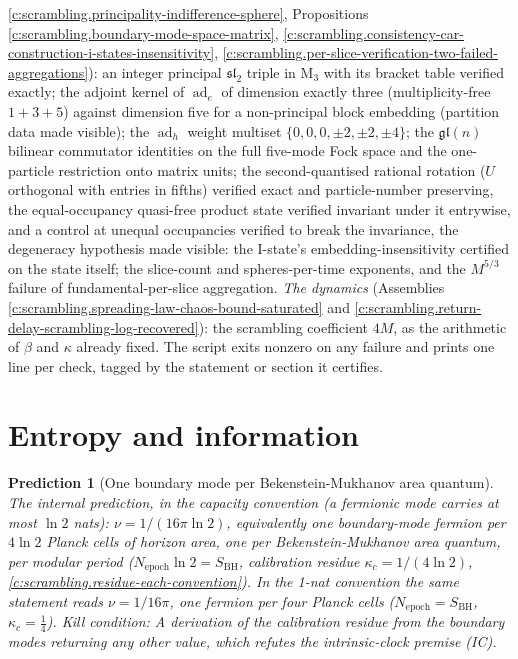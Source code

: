 \documentclass[11pt]{article}
\newtheorem{prediction}[theorem]{Prediction}
\theoremstyle{definition}
\theoremstyle{plain}
\providecommand{\Mat}{}\renewcommand{\Mat}{\mathrm{M}}
\begin{document}
\ref{c:scrambling.principality-indifference-sphere}, Propositions \ref{c:scrambling.boundary-mode-space-matrix}, \ref{c:scrambling.consistency-car-construction-i-states-insensitivity}, \ref{c:scrambling.per-slice-verification-two-failed-aggregations}): an integer principal $\mathfrak{sl}_2$ triple in $\Mat_3$ with its bracket table verified exactly; the adjoint kernel of $\operatorname{ad}_e$ of dimension exactly three (multiplicity-free $1 + 3 + 5$) against dimension five for a non-principal block embedding (partition data made visible); the $\operatorname{ad}_h$ weight multiset $\{0,0,0,\pm2,\pm2,\pm4\}$; the $\mathfrak{gl}(n)$ bilinear commutator identities on the full five-mode Fock space and the one-particle restriction onto matrix units; the second-quantised rational rotation ($U$ orthogonal with entries in fifths) verified exact and particle-number preserving, the equal-occupancy quasi-free product state verified invariant under it entrywise, and a control at unequal occupancies verified to break the invariance, the degeneracy hypothesis made visible: the I-state's embedding-insensitivity certified on the state itself; the slice-count and spheres-per-time exponents, and the $M^{5/3}$ failure of fundamental-per-slice aggregation. \emph{The dynamics} (Assemblies \ref{c:scrambling.spreading-law-chaos-bound-saturated} and \ref{c:scrambling.return-delay-scrambling-log-recovered}): the scrambling coefficient $4M$, as the arithmetic of $\beta$ and $\kappa$ already fixed. The script exits nonzero on any failure and prints one line per check, tagged by the statement or section it certifies.

\section{Entropy and information}

\begin{prediction}[One boundary mode per Bekenstein-Mukhanov area quantum]\label{c:pred.boundary-mode-density}
The internal prediction, in the capacity convention (a fermionic mode carries at most $\ln 2$ nats): $\nu = 1/(16\pi\ln 2)$, equivalently one boundary-mode fermion per $4\ln 2$ Planck cells of horizon area, one per Bekenstein-Mukhanov area quantum, per modular period ($N_{\mathrm{epoch}}\ln 2 = S_{\mathrm{BH}}$, calibration residue $\kappa_c = 1/(4\ln 2)$, \ref{c:scrambling.residue-each-convention}). In the 1-nat convention the same statement reads $\nu = 1/16\pi$, one fermion per four Planck cells ($N_{\mathrm{epoch}} = S_{\mathrm{BH}}$, $\kappa_c = \tfrac14$).
\emph{Kill condition:} A derivation of the calibration residue from the boundary modes returning any other value, which refutes the intrinsic-clock premise (IC).
\end{prediction}
\end{document}

